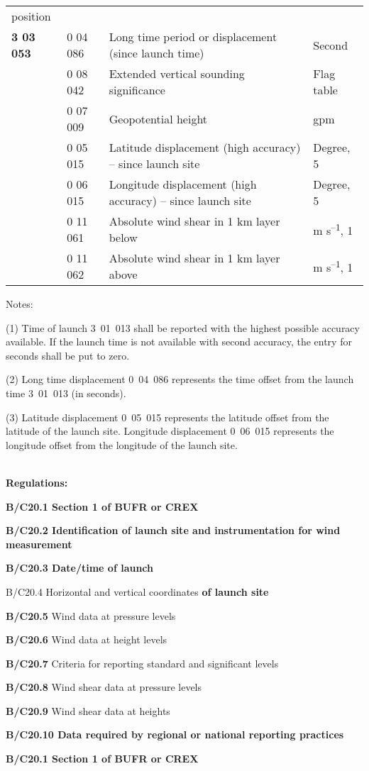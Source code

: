 \begin{longtable}[]{@{}llll@{}}
{position} &\tabularnewline
\textbf{3 03 053} & 0 04 086 & Long time period or displacement (since launch time) & Second\tabularnewline
& 0 08 042 & Extended vertical sounding significance & Flag table\tabularnewline
& 0 07 009 & Geopotential height & gpm\tabularnewline
& 0 05 015 & Latitude displacement (high accuracy) -- since launch site & Degree, 5\tabularnewline
& 0 06 015 & Longitude displacement (high accuracy) -- since launch site & Degree, 5\tabularnewline
& 0 11 061 & Absolute wind shear in 1 km layer below & m s\textsuperscript{--1}, 1\tabularnewline
& 0 11 062 & Absolute wind shear in 1 km layer above & m s\textsuperscript{--1}, 1\tabularnewline
\bottomrule
\end{longtable}

Notes:

(1) Time of launch 3~01~013 shall be reported with the highest possible accuracy available. If the launch time is not available with second accuracy, the entry for seconds shall be put to zero.

(2) Long time displacement 0~04~086 represents the time offset from the launch time 3~01~013 (in seconds).

(3) Latitude displacement 0~05~015 represents the latitude offset from the latitude of the launch site. Longitude displacement 0~06~015 represents the longitude offset from the longitude of the launch site.

\textbf{\\
Regulations:}

\textbf{B/C20.1 Section 1 of BUFR or CREX}

\textbf{B/C20.2 Identification of launch site and instrumentation for wind measurement}

\textbf{B/C20.3 Date/time of launch}

B/C20.4 Horizontal and vertical coordinates \textbf{of launch site}

\textbf{B/C20.5} Wind data at pressure levels

\textbf{B/C20.6} Wind data at height levels

\textbf{B/C20.7} Criteria for reporting standard and significant levels

\textbf{B/C20.8} Wind shear data at pressure levels

\textbf{B/C20.9} Wind shear data at heights

\textbf{B/C20.10 Data required by regional or national reporting practices}

\textbf{B/C20.1 Section 1 of BUFR or CREX}

